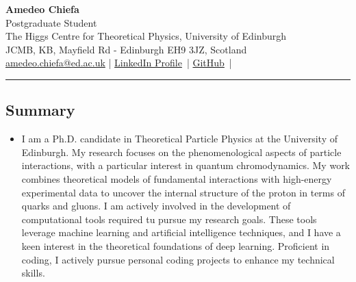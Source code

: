\documentclass[10pt,a4paper]{article}
\begin{document}
\begin{center}
    {\LARGE \textbf{Amedeo Chiefa}} \\[0.1cm]
    {\large Postgraduate Student} \\
    \vspace{0.2cm}
    \small
    The Higgs Centre for Theoretical Physics, University of Edinburgh \\[0.1cm]
    JCMB, KB, Mayfield Rd - Edinburgh EH9 3JZ, Scotland \\
    \vspace{0.2cm}
    \href{mailto:amedeo.chiefa@ed.ac.uk}{amedeo.chiefa@ed.ac.uk} |
    \href{https://www.linkedin.com/in/amedeo-chiefa-b6a6bb231/}{LinkedIn Profile}\ |
    \href{https://github.com/achiefa}{GitHub}\ |
    \normalsize
\end{center}

\hrule
\vspace{-0.4em}
\subsection*{Summary}
\begin{itemize}[leftmargin=1em]
  \item[] I am a Ph.D. candidate in Theoretical Particle Physics at the University of Edinburgh. 
          My research focuses on the phenomenological aspects of particle interactions, with a 
          particular interest in quantum chromodynamics. My work combines theoretical models of 
          fundamental interactions with high-energy experimental data to uncover the internal structure
          of the proton in terms of quarks and gluons. I am actively involved
          in the development of computational tools required tu pursue my research goals. These tools leverage 
          machine learning and artificial intelligence techniques, and I have a keen interest
          in the theoretical foundations of deep learning. Proficient in coding, I actively pursue personal
          coding projects to enhance my technical skills.
\end{itemize}

\end{document}
